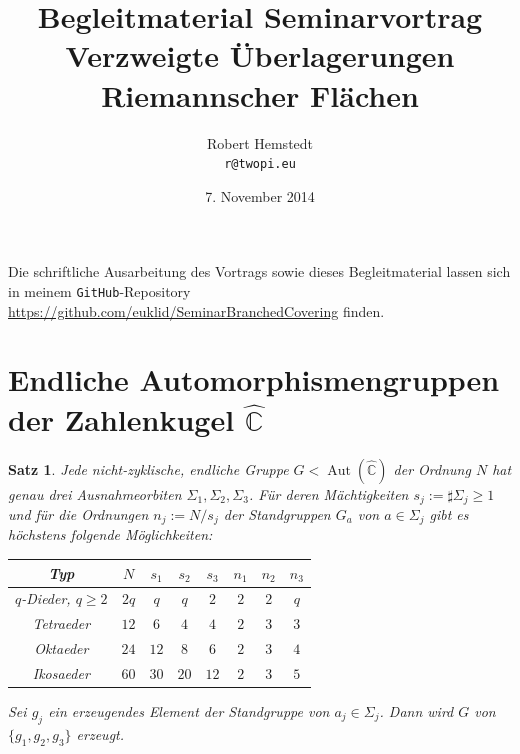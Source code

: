 \documentclass[12pt,a4paper]{article}
\author{Robert Hemstedt \\ \texttt{r@twopi.eu}}
\date{7. November 2014}
\title{Begleitmaterial Seminarvortrag Verzweigte Überlagerungen Riemannscher Flächen}
\theoremstyle{plain}
\newtheorem*{Satz}[Theorem]{Satz}
\newcommand{\C}{\mathbb{C}}
\newcommand{\Ch}{\hat{\C}}
\numberwithin{equation}{section}
\begin{document}
\maketitle
Die schriftliche Ausarbeitung des Vortrags sowie dieses Begleitmaterial lassen sich in meinem \texttt{GitHub}-Repository \url{https://github.com/euklid/SeminarBranchedCovering} finden.
\section*{Endliche Automorphismengruppen der Zahlenkugel $\hat{\C}$}
\begin{Satz}
Jede nicht-zyklische, endliche Gruppe $G < \operatorname{Aut}(\Ch)$ der Ordnung $N$ hat genau drei Ausnahmeorbiten $\Sigma_1,\Sigma_2,\Sigma_3$. Für deren Mächtigkeiten $s_j :=\sharp\Sigma_j \geq 1$ und für die Ordnungen $n_j:=N/s_j$ der Standgruppen $G_a$ von $a\in \Sigma_j$ gibt es höchstens folgende Möglichkeiten: \begin{center}
\begin{tabular}{|c|c|c|c|c|c|c|c|} \hline
Typ & $N$ & $s_1$ & $s_2$ & $s_3$ & $n_1$ & $n_2$ & $n_3$ \\\hline
$q$-Dieder, $q\geq 2$ & $2q$ & $q$ & $q$ & $2$ & $2$ & $2$ & $q$ \\\hline
Tetraeder & $12$ & $6$ & $4$ & $4$ & $2$ & $3$ & $3$ \\\hline
Oktaeder & $24$ & $12$ & $8$ & $6$ & $2$ & $3$ & $4$ \\\hline
Ikosaeder & $60$ & $30$ & $20$ & $12$ & $2$ & $3$ & $5$ \\\hline
\end{tabular}
\end{center}
Sei $g_j$ ein erzeugendes Element der Standgruppe von $a_j \in \Sigma_j$. Dann wird $G$ von $\{g_1, g_2, g_3\}$ erzeugt. 
\end{Satz}
\end{document}
